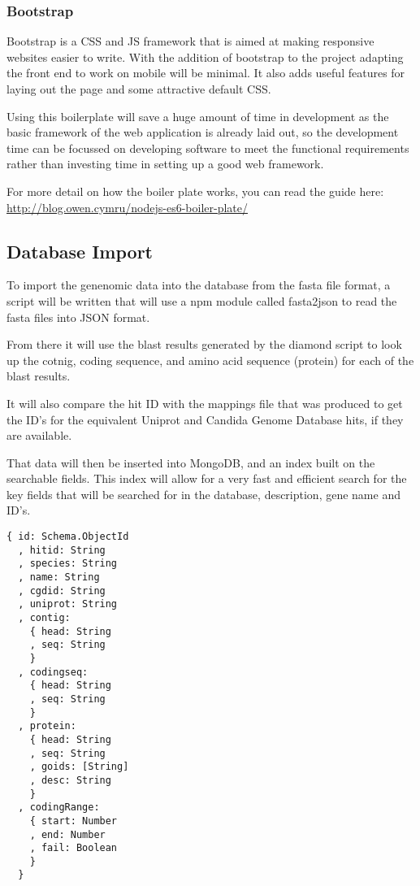 {    \subsubsection*{Bootstrap}

    Bootstrap is a CSS and JS framework that is aimed at making responsive websites easier to write. With the addition of bootstrap to the project adapting the front end to work on mobile will be minimal. It also adds useful features for laying out the page and some attractive default CSS. 

Using this boilerplate will save a huge amount of time in development as the basic framework of the web application is already laid out, so the development time can be focussed on developing software to meet the functional requirements rather than investing time in setting up a good web framework. 

For more detail on how the boiler plate works, you can read the guide here: \url{http://blog.owen.cymru/nodejs-es6-boiler-plate/}

\subsection{Database Import}
To import the genenomic data into the database from the fasta file format, a script will be written that will use a npm module called fasta2json\cite{fasta2json} to read the fasta files into JSON format. 

From there it will use the blast results generated by the diamond script to look up the cotnig, coding sequence, and amino acid sequence (protein) for each of the blast results. 

It will also compare the hit ID with the mappings file that was produced to get the ID's for the equivalent Uniprot and Candida Genome Database hits, if they are available. 

That data will then be inserted into MongoDB, and an index built on the searchable fields. This index will allow for a very fast and efficient search for the key fields that will be searched for in the database, description, gene name and ID's.

\begin{lstlisting}[caption=The database schema that will represent the hit object]
  { id: Schema.ObjectId
  , hitid: String
  , species: String
  , name: String
  , cgdid: String
  , uniprot: String
  , contig: 
    { head: String
    , seq: String 
    }
  , codingseq: 
    { head: String
    , seq: String 
    }
  , protein: 
    { head: String
    , seq: String
    , goids: [String]
    , desc: String 
    }
  , codingRange: 
    { start: Number
    , end: Number
    , fail: Boolean 
    }
  }
\end{lstlisting}

}
